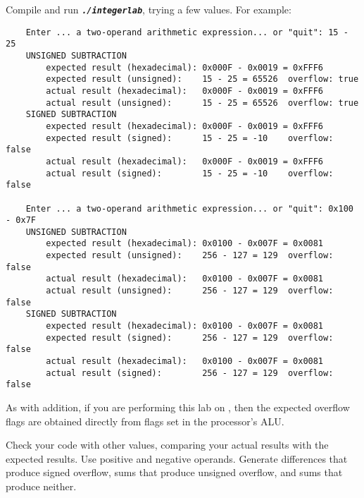 Compile and run \texttt{\textbf{\textit{./integerlab}}}, trying a few values.
For example:
\begin{verbatim}
    Enter ... a two-operand arithmetic expression... or "quit": 15 - 25
    UNSIGNED SUBTRACTION
        expected result (hexadecimal): 0x000F - 0x0019 = 0xFFF6
        expected result (unsigned):    15 - 25 = 65526	overflow: true
        actual result (hexadecimal):   0x000F - 0x0019 = 0xFFF6
        actual result (unsigned):      15 - 25 = 65526	overflow: true
    SIGNED SUBTRACTION
        expected result (hexadecimal): 0x000F - 0x0019 = 0xFFF6
        expected result (signed):      15 - 25 = -10	overflow: false
        actual result (hexadecimal):   0x000F - 0x0019 = 0xFFF6
        actual result (signed):        15 - 25 = -10	overflow: false

    Enter ... a two-operand arithmetic expression... or "quit": 0x100 - 0x7F
    UNSIGNED SUBTRACTION
        expected result (hexadecimal): 0x0100 - 0x007F = 0x0081
        expected result (unsigned):    256 - 127 = 129	overflow: false
        actual result (hexadecimal):   0x0100 - 0x007F = 0x0081
        actual result (unsigned):      256 - 127 = 129	overflow: false
    SIGNED SUBTRACTION
        expected result (hexadecimal): 0x0100 - 0x007F = 0x0081
        expected result (signed):      256 - 127 = 129	overflow: false
        actual result (hexadecimal):   0x0100 - 0x007F = 0x0081
        actual result (signed):        256 - 127 = 129	overflow: false
\end{verbatim}

As with addition, if you are performing this lab on \runtimeenvironment, then the expected overflow flags are obtained directly from flags set in the processor's ALU\@.

Check your code with other values, comparing your actual results with the expected results.
Use positive and negative operands.
Generate differences that produce signed overflow, sums that produce unsigned overflow, and sums that produce neither.
